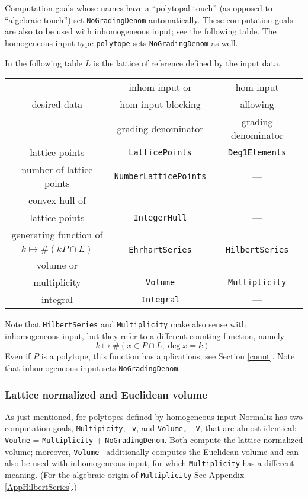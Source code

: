 \documentclass[12pt,a4paper]{scrartcl}
\theoremstyle{definition}
\begin{document}
Computation goals whose names have a ``polytopal touch'' (as opposed to ``algebraic touch'') set \verb|NoGradingDenom| automatically. These computation goals are also to be used with inhomogeneous input; see the following table. The homogeneous input type \verb|polytope| sets \verb|NoGradingDenom| as well.

In the following table $L$ is the lattice  of reference defined by the input data.

\begin{center}
\begin{tabular}[pos]{|c|c|c|}
\hline
             & inhom input or&  hom input\\
desired data & hom input blocking & allowing\\
             &grading denominator& grading denominator\\
\hline\hline
lattice points &\verb|LatticePoints|&\verb|Deg1Elements|\\
\hline
number of lattice points& \verb|NumberLatticePoints|& ---\\ 
\hline
convex hull of&&\\
lattice points& \verb|IntegerHull|& ---\\ 
\hline
generating function of&&\\
$k\mapsto \#(kP\cap L) $&\verb|EhrhartSeries|&\verb|HilbertSeries|\\
\hline
volume or&&\\
multiplicity& \verb|Volume|&\verb|Multiplicity|\\
\hline
integral&\verb|Integral|&---\\
\hline
\end{tabular}
\end{center}

Note that \verb|HilbertSeries| and \verb|Multiplicity| make also sense with inhomogeneous input, but they refer to a different counting function, namely
$$
k\mapsto \#(x\in P\cap L, \deg x=k).
$$
Even if $P$ is a polytope, this function has applications; see Section \ref{count}. Note that inhomogeneous input sets \verb|NoGradingDenom|.

\subsubsection{Lattice normalized and Euclidean volume}\label{volume}

As just mentioned, for polytopes defined by homogeneous input Normaliz has two computation goals, \verb|Multipicity|, \verb|-v|, and \verb|Volume, -V|, that are almost identical:  \verb|Voulme| = \verb|Multiplicity| + \verb|NoGradingDenom|. Both compute the lattice normalized volume; moreover, \verb|Volume | additionally computes the Euclidean volume and can also be used with inhomogeneous input, for which \verb|Multiplicity| has a different meaning. (For the algebraic origin of \verb|Multiplicity| See Appendix \ref{AppHilbertSeries}.)
\end{document}

